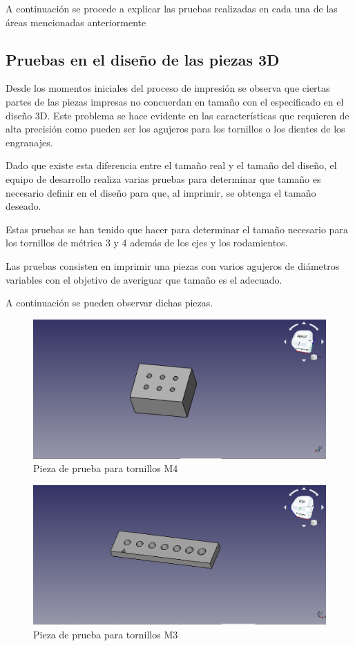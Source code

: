 A continuación se procede a explicar las pruebas realizadas en cada una de las áreas mencionadas anteriormente

\subsection{Pruebas en el diseño de las piezas 3D}

Desde los momentos iniciales del proceso de impresión se observa que ciertas partes de las piezas impresas no concuerdan en tamaño con el especificado en el diseño 3D. Este problema se hace evidente en las características que requieren de alta precisión como pueden ser los agujeros para los tornillos o los dientes de los engranajes.

Dado que existe esta diferencia entre el tamaño real y el tamaño del diseño, el equipo de desarrollo realiza varias pruebas para determinar que tamaño es necesario definir en el diseño para que, al imprimir, se obtenga el tamaño deseado.

Estas pruebas se han tenido que hacer para determinar el tamaño necesario para los tornillos de métrica 3 y 4 además de los ejes y los rodamientos.

Las pruebas consisten en imprimir una piezas con varios agujeros de diámetros variables con el objetivo de averiguar que tamaño es el adecuado.

A continuación se pueden observar dichas piezas.

\begin{figure}[H]
    \centering
    \includegraphics[width=.7\linewidth]{pictures/LadrilloPrueba.png}
    \caption{Pieza de prueba para tornillos M4}
    \label{fig:prueba_m4}
\end{figure}

\begin{figure}[H]
    \centering
    \includegraphics[width=.7\linewidth]{pictures/PruebaM3.png}
    \caption{Pieza de prueba para tornillos M3}
    \label{fig:prueba_m3}
\end{figure}

